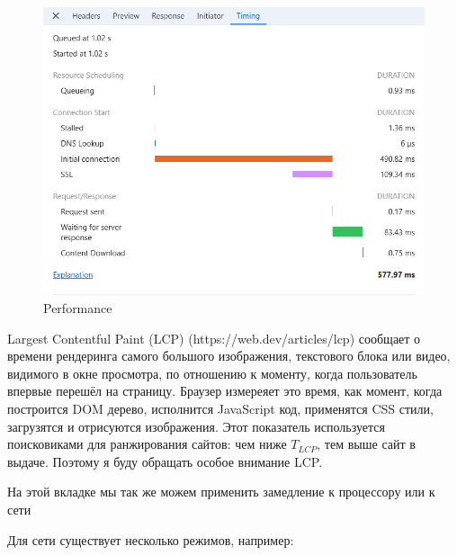 \documentclass[12pt]{article}
\begin{document}
\begin{figure}[H]
    \centering
    \includegraphics[width=1\textwidth]{../images/network__timing.png}
    \caption{Performance}
\end{figure}

Largest Contentful Paint (LCP) (https://web.dev/articles/lcp) сообщает о времени рендеринга
самого большого изображения, текстового блока или видео,
видимого в окне просмотра, по отношению к моменту,
когда пользователь впервые перешёл на страницу.
Браузер измереяет это время, как момент, когда построится DOM дерево,
исполнится JavaScript код, применятся CSS стили, загрузятся и отрисуются изображения.
Этот показатель используется поисковиками для ранжирования сайтов: чем ниже $T_{LCP}$,
тем выше сайт в выдаче.
Поэтому я буду обращать особое внимание LCP.

На этой вкладке мы так же можем применить замедление к процессору или к сети

Для сети существует несколько режимов, например:
\end{document}
